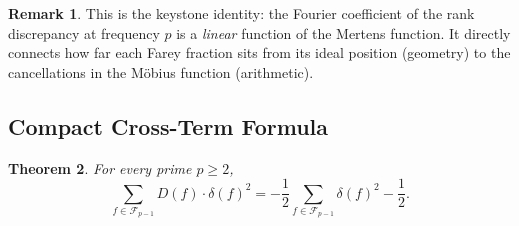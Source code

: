 \documentclass[11pt]{article}
\newtheorem{theorem}{Theorem}[section]
\theoremstyle{definition}
\newtheorem{remark}[theorem]{Remark}
\newcommand{\F}{\mathcal{F}}
\begin{document}
\begin{remark}
This is the keystone identity: the Fourier coefficient of the
rank discrepancy at frequency $p$ is a \emph{linear} function
of the Mertens function.  It directly connects how far each
Farey fraction sits from its ideal position (geometry) to the
cancellations in the M\"obius function (arithmetic).
\end{remark}



\subsection{Compact Cross-Term Formula}

\begin{theorem}\label{thm:cross-term}
For every prime $p \ge 2$,
\begin{equation}
  \sum_{f \in \F_{p-1}} D(f) \cdot \delta(f)^2
  = -\frac{1}{2}\sum_{f \in \F_{p-1}} \delta(f)^2 - \frac{1}{2}.
\end{equation}
\end{theorem}
\end{document}

